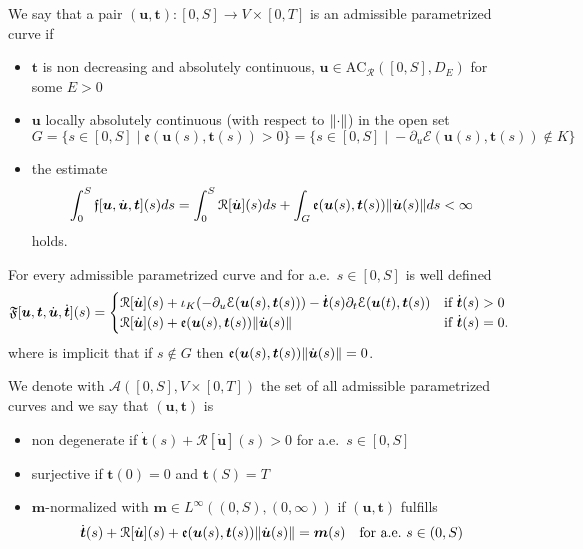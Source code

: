 \begin{defi}
We say that a pair $(\boldsymbol{u},\boldsymbol{t})\colon[0,S]\to V\times[0,T]$ is an admissible parametrized curve if
\begin{itemize}
\item[(i)] $\boldsymbol{t}$ is non decreasing and absolutely continuous, $\boldsymbol{u}\in\text{AC}_\mathcal{R}([0,S],D_E)$ for some $E>0$
\item[(ii)] $\boldsymbol{u}$ locally absolutely continuous (with respect to $\lVert\cdot\rVert$) in the open set
\[
G=\{s\in[0,S]\;|\;\mathfrak{e}(\boldsymbol{u}(s),\boldsymbol{t}(s))>0\}=\{s\in[0,S]\;|\;-\partial_u\mathcal{E}(\boldsymbol{u}(s),\boldsymbol{t}(s))\notin K\}
\]
\item[(iii)] the estimate
\[
\int_0^S\mathfrak{f}[\boldsymbol{u},\dot{\boldsymbol{u}},\boldsymbol{t}](s)ds=\int_0^S\mathcal{R}[\dot{\boldsymbol{u}}](s)ds+\int_G\mathfrak{e}(\boldsymbol{u}(s),\boldsymbol{t}(s))\lVert\dot{\boldsymbol{u}}(s)\rVert ds<\infty
\]
holds.
\end{itemize}
For every admissible parametrized curve and for a.e.\ $s\in[0,S]$ is well defined
\[
\mathfrak{F}[\boldsymbol{u},\boldsymbol{t},\dot{\boldsymbol{u}},\dot{\boldsymbol{t}}](s)=\begin{cases}
\mathcal{R}[\dot{\boldsymbol{u}}](s)+\iota_K(-\partial_u\mathcal{E}(\boldsymbol{u}(s),\boldsymbol{t}(s)))-\dot{\boldsymbol{t}}(s)\partial_t\mathcal{E}(\boldsymbol{u}(t),\boldsymbol{t}(s)) & \text{if $\dot{\boldsymbol{t}}(s)>0$} \\
\mathcal{R}[\dot{\boldsymbol{u}}](s)+\mathfrak{e}(\boldsymbol{u}(s),\boldsymbol{t}(s))\lVert\dot{\boldsymbol{u}}(s)\rVert & \text{if $\dot{\boldsymbol{t}}(s)=0$}.
\end{cases}
\]
where is implicit that if $s\notin G$ then $\mathfrak{e}(\boldsymbol{u}(s),\boldsymbol{t}(s))\lVert\dot{\boldsymbol{u}}(s)\rVert=0$.

We denote with $\mathscr{A}([0,S],V\times[0,T])$ the set of all admissible parametrized curves and we say that $(\boldsymbol{u},\boldsymbol{t})$ is
\begin{itemize}
\item[(i)] non degenerate if $\dot{\boldsymbol{t}}(s)+\mathcal{R}[\dot{\boldsymbol{u}}](s)>0$ for a.e.\ $s\in[0,S]$
\item[(ii)] surjective if $\boldsymbol{t}(0)=0$ and $\boldsymbol{t}(S)=T$
\item[(iii)] $\boldsymbol{m}$-normalized with $\boldsymbol{m}\in L^\infty((0,S),(0,\infty))$ if $(\boldsymbol{u},\boldsymbol{t})$ fulfills
\[
\dot{\boldsymbol{t}}(s)+\mathcal{R}[\dot{\boldsymbol{u}}](s)+\mathfrak{e}(\boldsymbol{u}(s),\boldsymbol{t}(s))\lVert\dot{\boldsymbol{u}}(s)\rVert=\boldsymbol{m}(s)\quad\text{for a.e.\ $s\in(0,S)$}
\]
\end{itemize}
\end{defi}
